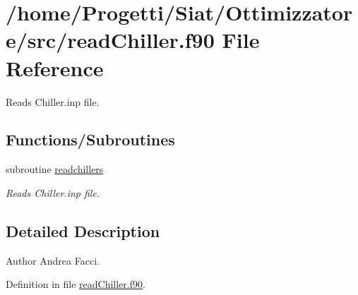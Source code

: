 \hypertarget{read_chiller_8f90}{\section{/home/\-Progetti/\-Siat/\-Ottimizzatore/src/read\-Chiller.f90 File Reference}
\label{read_chiller_8f90}
}


Reads Chiller.\-inp file.  


\subsection*{Functions/\-Subroutines}
\begin{DoxyCompactItemize}
\item 
subroutine \hyperlink{read_chiller_8f90_a3c06bf38f25f8177df77cbf0c1cfd834}{readchillers}
\begin{DoxyCompactList}\small\item\em Reads Chiller.\-inp file. \end{DoxyCompactList}\end{DoxyCompactItemize}


\subsection{Detailed Description}
\begin{DoxyAuthor}{Author}
Andrea Facci. 
\end{DoxyAuthor}


Definition in file \hyperlink{read_chiller_8f90_source}{read\-Chiller.\-f90}.



